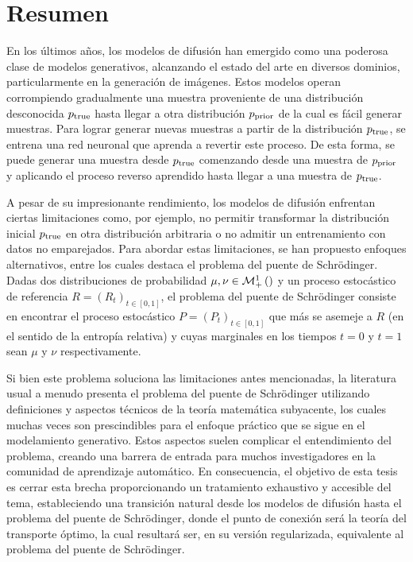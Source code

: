 \chapter*{Resumen}

En los últimos años, los modelos de difusión han emergido como una poderosa clase de modelos generativos, alcanzando el estado del arte en diversos dominios, particularmente en la generación de imágenes. Estos modelos operan corrompiendo gradualmente una muestra proveniente de una distribución desconocida $p_{\operatorname{true}}$ hasta llegar a otra distribución $p_{\operatorname{prior}}$ de la cual es fácil generar muestras. Para lograr generar nuevas muestras a partir de la distribución $p_{\operatorname{true}}$, se entrena una red neuronal que aprenda a revertir este proceso. De esta forma, se puede generar una muestra desde $p_{\operatorname{true}}$ comenzando desde una muestra de $p_{\operatorname{prior}}$ y aplicando el proceso reverso aprendido hasta llegar a una muestra de $p_{\operatorname{true}}$.

A pesar de su impresionante rendimiento, los modelos de difusión enfrentan ciertas limitaciones como, por ejemplo, no permitir transformar la distribución inicial $p_{\operatorname{true}}$ en otra distribución arbitraria o no admitir un entrenamiento con datos no emparejados. Para abordar estas limitaciones, se han propuesto enfoques alternativos, entre los cuales destaca el problema del puente de Schrödinger. Dadas dos distribuciones de probabilidad $\mu,\nu\in\mathcal{M}_+^1\left(\right)$ y un proceso estocástico de referencia $R=(R_t)_{t\in[0,1]}$, el problema del puente de Schrödinger consiste en encontrar el proceso estocástico $P=(P_t)_{t\in[0,1]}$ que más se asemeje a $R$ (en el sentido de la entropía relativa) y cuyas marginales en los tiempos $t=0$ y $t=1$ sean $\mu$ y $\nu$ respectivamente.

Si bien este problema soluciona las limitaciones antes mencionadas, la literatura usual a menudo presenta el problema del puente de Schrödinger utilizando definiciones y aspectos técnicos de la teoría matemática subyacente, los cuales muchas veces son prescindibles para el enfoque práctico que se sigue en el modelamiento generativo. Estos aspectos suelen complicar el entendimiento del problema, creando una barrera de entrada para muchos investigadores en la comunidad de aprendizaje automático. En consecuencia, el objetivo de esta tesis es cerrar esta brecha proporcionando un tratamiento exhaustivo y accesible del tema, estableciendo una transición natural desde los modelos de difusión hasta el problema del puente de Schrödinger, donde el punto de conexión será la teoría del transporte óptimo, la cual resultará ser, en su versión regularizada, equivalente al problema del puente de Schrödinger.

